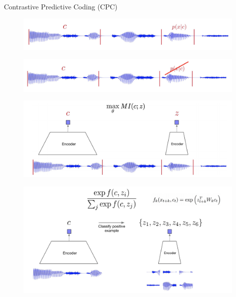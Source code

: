 \begin{frame}[allowframebreaks]{Contrastive Predictive Coding (CPC)}
    \framebreak

    \begin{figure}
        \centering
        \includegraphics[width=1\linewidth,height=0.9\textheight,keepaspectratio]{images/ssl/slide_45_1_img.png}
    \end{figure}

    \framebreak

    \begin{figure}
        \centering
        \includegraphics[width=1\linewidth,height=0.9\textheight,keepaspectratio]{images/ssl/slide_46_2_img.png}
    \end{figure}

    \framebreak

    \begin{figure}
        \centering
        \includegraphics[width=1\linewidth,height=0.9\textheight,keepaspectratio]{images/ssl/slide_47_3_img.png}
    \end{figure}

    \framebreak

    \begin{figure}
        \centering
        \includegraphics[width=1\linewidth,height=0.9\textheight,keepaspectratio]{images/ssl/slide_48_4_img.png}
    \end{figure}


\end{frame}
